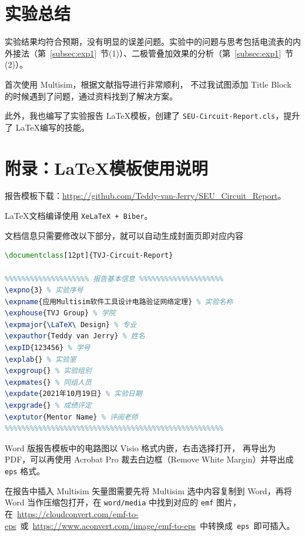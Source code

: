 \documentclass[12pt]{SEU-Circuit-Report}
\begin{document}
    \newpage

    \section{实验总结}

        实验结果均符合预期，没有明显的误差问题。实验中的问题与思考包括电流表的内外接法（第~\ref{subsec:exp1}~节(1)）、二极管叠加效果的分析（第~\ref{subsec:exp1}~节(2)）。

        首次使用 Multisim，根据文献\cite{teaching_schedule}指导进行非常顺利，
        不过我试图添加 Title Block 的时候遇到了问题，通过资料\cite{multisim_help}找到了解决方案。

        此外，我也编写了实验报告 \LaTeX 模板，创建了 \texttt{SEU-Circuit-Report.cls}，提升了 \LaTeX 编写的技能。

    \printbibliography

    \newpage

    \section*{附录：\LaTeX 模板使用说明}

        报告模板下载：\url{https://github.com/Teddy-van-Jerry/SEU_Circuit_Report}。

        \LaTeX 文档编译使用 \texttt{XeLaTeX + Biber}。

        文档信息只需要修改以下部分，就可以自动生成封面页即对应内容

        \begin{lstlisting}[language=TeX]
%% 使用实验报告模板类（字体大小 12pt 最适合）
\documentclass[12pt]{TVJ-Circuit-Report}

%%%%%%%%%%%%%%%%%%%% 报告基本信息 %%%%%%%%%%%%%%%%%%%%
\expno{3} % 实验序号
\expname{应用Multisim软件工具设计电路验证网络定理} % 实验名称
\exphouse{TVJ Group} % 学院
\expmajor{\LaTeX\ Design} % 专业
\expauthor{Teddy van Jerry} % 姓名
\expID{123456} % 学号
\explab{} % 实验室
\expgroup{} % 实验组别
\expmates{} % 同组人员
\expdate{2021年10月19日} % 实验日期
\expgrade{} % 成绩评定
\exptutor{Mentor Name} % 评阅老师
%%%%%%%%%%%%%%%%%%%%%%%%%%%%%%%%%%%%%%%%%%%%%%%%%%%%
        \end{lstlisting}

        Word 版报告模板中的电路图以 Visio 格式内嵌，右击选择打开，
        再导出为 PDF，可以再使用 Acrobat Pro 裁去白边框（Remove White Margin）并导出成 \texttt{eps} 格式。

        在报告中插入 Multisim 矢量图需要先将 Multisim 选中内容复制到 Word，再将 Word 当作压缩包打开，在 \texttt{word/media} 中找到对应的 \texttt{emf} 图片，在~\url{https://cloudconvert.com/emf-to-eps}~或~\url{https://www.aconvert.com/image/emf-to-eps}~中转换成~\texttt{eps}~即可插入。
\end{document}
